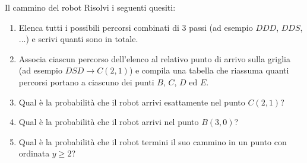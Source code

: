 \begin{esercizio}{Il cammino del robot}
Risolvi i seguenti quesiti:

\begin{enumerate}[label=\alph*)]
  \item Elenca tutti i possibili percorsi combinati di 3 passi (ad esempio $DDD$, $DDS$, ...) e scrivi quanti sono in totale.
  \item Associa ciascun percorso dell'elenco al relativo punto di arrivo sulla griglia (ad esempio $DSD \to C(2,1)$) e compila una tabella che riassuma quanti percorsi portano a ciascuno dei punti $B$, $C$, $D$ ed $E$.
  \item Qual è la probabilità che il robot arrivi esattamente nel punto $C(2,1)$?
  \item Qual è la probabilità che il robot arrivi nel punto $B(3,0)$?
  \item Qual è la probabilità che il robot termini il suo cammino in un punto con ordinata $y \ge 2$?
\end{enumerate}

\responsespace{3.8cm}


\end{esercizio}
